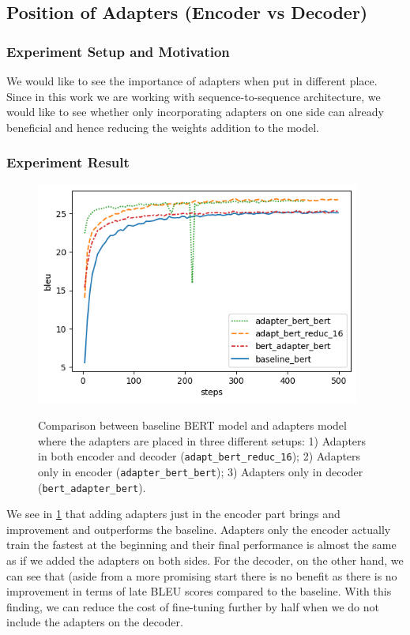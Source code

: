 \subsection{Position of Adapters (Encoder vs Decoder)}
\label{sec:posada}
\subsubsection{Experiment Setup and Motivation}
We would like to see the importance of adapters when put in different place. Since in this work we are working with sequence-to-sequence architecture, we would like to see whether only incorporating adapters on one side can already beneficial and hence reducing the weights addition to the model.

\subsubsection{Experiment Result}
\begin{figure}[]
    {\includegraphics[width=0.95\textwidth]{img/bert_pos.png}}
    \centering
    \caption{Comparison between baseline BERT model and adapters model where the adapters are placed in three different setups: 1) Adapters in both encoder and decoder (\texttt{adapt\_bert\_reduc\_16}); 2) Adapters only in encoder (\texttt{adapter\_bert\_bert}); 3) Adapters only in decoder (\texttt{bert\_adapter\_bert}).}
    \label{img:adapt_bert_pos}
\end{figure}
We see in \cref{img:adapt_bert_pos} that adding adapters just in the encoder part brings and improvement and outperforms the baseline. Adapters only the encoder actually train the fastest at the beginning and their final performance is almost the same as if we added the adapters on both sides. For the decoder, on the other hand, we can see that (aside from a more promising start there is no benefit as there is no improvement in terms of late BLEU scores compared to the baseline. With this finding, we can reduce the cost of fine-tuning further by half when we do not include the adapters on the decoder.

